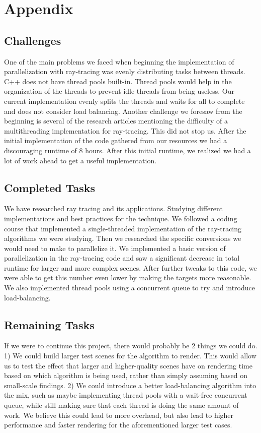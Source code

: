 \documentclass[conference]{IEEEtran}
\begin{document}
\section{Appendix}
\subsection{Challenges}\label{AA}
One of the main problems we faced when beginning the implementation of parallelization with ray-tracing was evenly distributing tasks between threads. C++ does not have thread pools built-in. Thread pools would help in the organization of the threads to prevent idle threads from being useless. Our current implementation evenly splits the threads and waits for all to complete and does not consider load balancing. Another challenge we foresaw from the beginning is several of the research articles mentioning the difficulty of a multithreading implementation for ray-tracing. This did not stop us. After the initial implementation of the code gathered from our resources we had a discouraging runtime of 8 hours. After this initial runtime, we realized we had a lot of work ahead to get a useful implementation.
\subsection{Completed Tasks}\label{AA}
We have researched ray tracing and its applications. Studying different implementations and best practices for the technique. We followed a coding course that implemented a single-threaded implementation of the ray-tracing algorithms we were studying. Then we researched the specific conversions we would need to make to parallelize it. We implemented a basic version of parallelization in the ray-tracing code and saw a significant decrease in total runtime for larger and more complex scenes. After further tweaks to this code, we were able to get this number even lower by making the targets more reasonable. We also implemented thread pools using a concurrent queue to try and introduce load-balancing.

\subsection{Remaining Tasks}\label{AA}
If we were to continue this project, there would probably be 2 things we could do. 1) We could build larger test scenes for the algorithm to render. This would allow us to test the effect that larger and higher-quality scenes have on rendering time based on which algorithm is being used, rather than simply assuming based on small-scale findings. 2) We could introduce a better load-balancing algorithm into the mix, such as maybe implementing thread pools with a wait-free concurrent queue, while still making sure that each thread is doing the same amount of work. We believe this could lead to more overhead, but also lead to higher performance and faster rendering for the aforementioned larger test cases.
\end{document}
